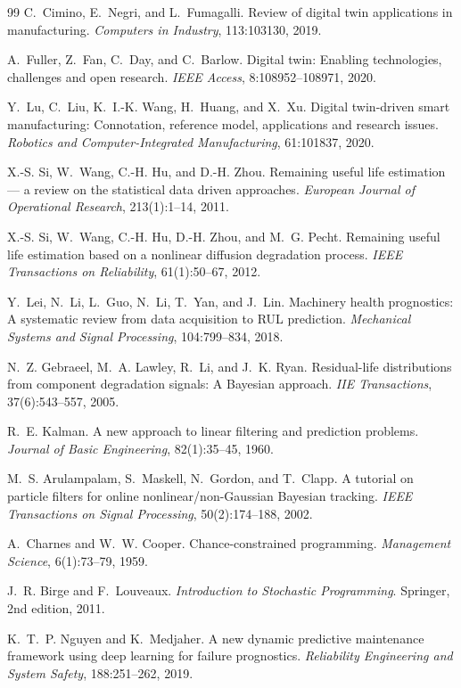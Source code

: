 \begin{thebibliography}{99}
C.~Cimino, E.~Negri, and L.~Fumagalli.
Review of digital twin applications in manufacturing.
\emph{Computers in Industry}, 113:103130, 2019.

A.~Fuller, Z.~Fan, C.~Day, and C.~Barlow.
Digital twin: Enabling technologies, challenges and open research.
\emph{IEEE Access}, 8:108952--108971, 2020.

Y.~Lu, C.~Liu, K.~I.-K. Wang, H.~Huang, and X.~Xu.
Digital twin-driven smart manufacturing: Connotation, reference model, applications and research issues.
\emph{Robotics and Computer-Integrated Manufacturing}, 61:101837, 2020.

X.-S. Si, W.~Wang, C.-H. Hu, and D.-H. Zhou.
Remaining useful life estimation --- a review on the statistical data driven approaches.
\emph{European Journal of Operational Research}, 213(1):1--14, 2011.

X.-S. Si, W.~Wang, C.-H. Hu, D.-H. Zhou, and M.~G. Pecht.
Remaining useful life estimation based on a nonlinear diffusion degradation process.
\emph{IEEE Transactions on Reliability}, 61(1):50--67, 2012.

Y.~Lei, N.~Li, L.~Guo, N.~Li, T.~Yan, and J.~Lin.
Machinery health prognostics: A systematic review from data acquisition to {RUL} prediction.
\emph{Mechanical Systems and Signal Processing}, 104:799--834, 2018.

N.~Z. Gebraeel, M.~A. Lawley, R.~Li, and J.~K. Ryan.
Residual-life distributions from component degradation signals: A {B}ayesian approach.
\emph{IIE Transactions}, 37(6):543--557, 2005.

R.~E. Kalman.
A new approach to linear filtering and prediction problems.
\emph{Journal of Basic Engineering}, 82(1):35--45, 1960.

M.~S. Arulampalam, S.~Maskell, N.~Gordon, and T.~Clapp.
A tutorial on particle filters for online nonlinear/non-{G}aussian {B}ayesian tracking.
\emph{IEEE Transactions on Signal Processing}, 50(2):174--188, 2002.

A.~Charnes and W.~W. Cooper.
Chance-constrained programming.
\emph{Management Science}, 6(1):73--79, 1959.

J.~R. Birge and F.~Louveaux.
\emph{Introduction to Stochastic Programming}.
Springer, 2nd edition, 2011.

K.~T.~P. Nguyen and K.~Medjaher.
A new dynamic predictive maintenance framework using deep learning for failure prognostics.
\emph{Reliability Engineering and System Safety}, 188:251--262, 2019.


\end{thebibliography}

